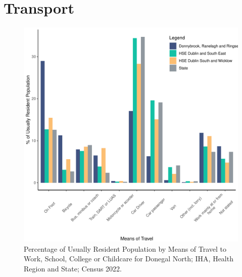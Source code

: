 \documentclass{article}
\begin{document}
\section{Transport}\label{sect:Trans}
\begin{figure}[H]
	\centering
	\includegraphics[width = 120mm]{../figures/TravelED.pdf}
	\caption{Percentage of Usually Resident Population by Means of Travel to Work, School, College or Childcare for Donegal North; IHA, Health Region and State; Census 2022.}
	\label{fig:vbnv}
	\end{figure}
\end{document}
